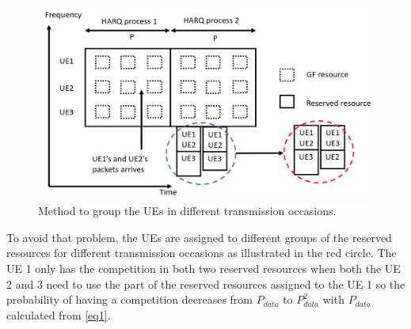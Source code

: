 \documentclass[conference]{IEEEtran}
\begin{document}
\begin{figure}[tbp]
\centerline{\includegraphics[scale=0.21]{fig5.png}}
\caption{Method to group the UEs in different transmission occasions.}
\label{fig5}
\end{figure}

To avoid that problem, the UEs are assigned to different groups of the reserved resources for different transmission occasions as illustrated in the red circle. The UE 1 only has the competition in both two reserved resources when both the UE 2 and 3 need to use the part of the reserved resources assigned to the UE 1 so the probability of having a competition decreases from $P_{data}$ to $P_{data}^2$ with $P_{data}$ calculated from \eqref{eq1}.
\end{document}
